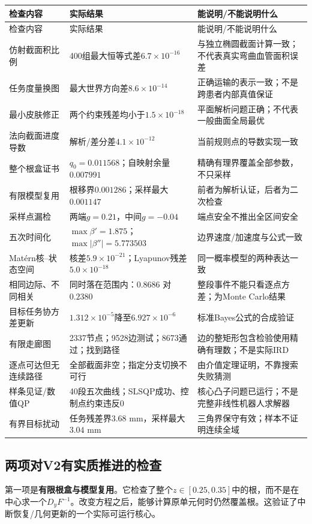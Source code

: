 \documentclass[UTF8,11pt,a4paper,fontset=fandol]{ctexart}
\numberwithin{equation}{section}
\theoremstyle{definition}
\begin{document}
\begin{longtable}{p{}p{}p{}}
\toprule 检查内容 & 实际结果 & 能说明/不能说明什么\\\midrule\endfirsthead
\toprule 检查内容 & 实际结果 & 能说明/不能说明什么\\\midrule\endhead
仿射截面积比例 & 400组最大恒等式差$6.7\times10^{-16}$ & 与独立椭圆截面计算一致；不代表真实弯曲血管面积误差\\
任务度量换图 & 最大世界方向差$8.6\times10^{-14}$ & 正确运输的表示一致；不是跨患者内部真值保证\\
最小皮肤修正 & 两个约束残差均小于$1.5\times10^{-18}$ & 平面解析问题正确；不代表一般曲面全局最优\\
法向截面进度导数 & 解析/差分差$4.1\times10^{-12}$ & 当前规则点的导数实现一致\\
整个根盒证书 & $q_0=0.011568$；自映射余量$0.007991$ & 精确有理界覆盖全部参数，不只采样\\
有限模型复用 & 根移界$0.001286$；采样最大$0.001147$ & 前者为解析认证，后者为二次检查\\
采样点漏检 & 两端$g=0.21$，中间$g=-0.04$ & 端点安全不推出全区间安全\\
五次时间化 & $\max\beta'=1.875$；$\max|\beta''|=5.773503$ & 边界速度/加速度与公式一致\\
Mat\'ern核--状态空间 & 核差$5.9\times10^{-21}$；Lyapunov残差$5.0\times10^{-18}$ & 同一概率模型的两种表达一致\\
相同边际、不同相关 & 同时落在范围内：$0.8686$ 对 $0.2380$ & 整段事件不能只看逐点方差；为Monte Carlo结果\\
目标任务协方差更新 & $1.312\times10^{-5}$降至$6.927\times10^{-6}$ & 标准Bayes公式的合成验证\\
有限走廊图 & 2337节点；9528边测试；8673通过；找到路径 & 边的整矩形包含检验使用精确有理数；不是实际IRD\\
逐点可达但无连续路径 & 全部截面非空；指定分支切换不可行 & 由介值定理证明，不靠搜索失败猜测\\
样条见证/数值QP & 40段五次曲线；SLSQP成功、控制点约束违反0 & 核心凸子问题已运行；不是完整非线性机器人求解器\\
有界目标扰动 & 任务残差界$3.68$ mm，采样最大$3.04$ mm & 三角界保守有效；样本不证明连续全域\\\bottomrule
\end{longtable}

\subsection{两项对V2有实质推进的检查}
第一项是\textbf{有限根盒与模型复用}。它检查了整个$z\in[0.25,0.35]$中的根，而不是在中心求一个$D_yF^{-1}$。改变方程之后，能够计算原单元何时仍然覆盖根。这验证了中断恢复/几何更新的一个实际可运行核心。
\end{document}
